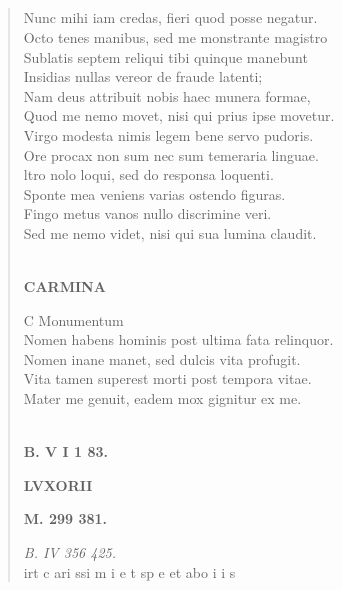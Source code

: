 \documentclass[11pt, a4paper]{report}
\begin{document}
            \subsection*{}
      \begin{verse}
       \lbrack Nunc mihi iam credas, fieri quod posse negatur. \\ Octo tenes manibus, sed me monstrante magistro \\ Sublatis septem reliqui tibi quinque manebunt \rbrack  \\ Insidias nullas vereor de fraude latenti; \\ Nam deus attribuit nobis haec munera formae, \\ Quod me nemo movet, nisi qui prius ipse movetur. \\ Virgo modesta nimis legem bene servo pudoris. \\ Ore procax non sum nec sum temeraria linguae. \\ ltro nolo loqui, sed do responsa loquenti. \\ Sponte mea veniens varias ostendo figuras. \\ Fingo metus vanos nullo discrimine veri. \\ Sed me nemo videt, nisi qui sua lumina claudit. \\ 
        ﻿\pagebreak 
    \begin{center} \textbf{CARMINA} \end{center} \marginpar{[246]} C Monumentum \\ Nomen habens hominis post ultima fata relinquor. \\ Nomen inane manet, sed dulcis vita profugit. \\ Vita tamen superest morti post tempora vitae. \\ Mater me genuit, eadem mox gignitur ex me. \\ 
        ﻿\pagebreak 
    \begin{center} \textbf{B. V I 1 83.} \end{center}\begin{center} \textbf{LVXORII} \end{center}\begin{center} \textbf{M. 299 381.} \end{center}\textit{B. IV 356 425.} \\ irt c ari ssi m i e t sp e et abo i i s \\ 
      \end{verse}
  
\end{document}
